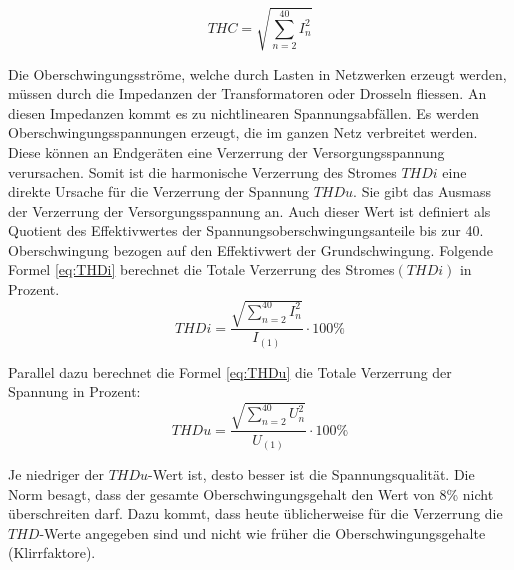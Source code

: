 \begin{equation}\label{eq:THC}
THC = {\sqrt{\sum_{n=2}^{40} I_n^2}}
\end{equation}



Die Oberschwingungsströme, welche durch Lasten in Netzwerken erzeugt werden, müssen durch die Impedanzen der Transformatoren oder Drosseln fliessen. An diesen Impedanzen kommt es zu nichtlinearen Spannungsabfällen. Es werden Oberschwingungsspannungen erzeugt, die im ganzen Netz verbreitet werden. Diese können an Endgeräten eine Verzerrung der Versorgungsspannung verursachen. Somit ist die harmonische Verzerrung des Stromes $THDi$ eine direkte Ursache für die Verzerrung der Spannung $THDu$. Sie gibt das Ausmass der Verzerrung der Versorgungsspannung an. Auch dieser Wert ist definiert als Quotient des Effektivwertes der Spannungsoberschwingungsanteile bis zur 40. Oberschwingung bezogen auf den Effektivwert der Grundschwingung. 
Folgende Formel \ref{eq:THDi} berechnet die Totale Verzerrung des Stromes$(THDi)$ in Prozent.
\begin{equation}\label{eq:THDi}
THDi = \frac{\sqrt{\sum_{n=2}^{40} I_n^2}}{I_{(1)}} \cdot 100 \%
\end{equation}

Parallel dazu berechnet die Formel \ref{eq:THDu} die Totale Verzerrung der Spannung in Prozent:
\begin{equation}\label{eq:THDu}
THDu = \frac{\sqrt{\sum_{n=2}^{40} U_n^2}}{U_{(1)}} \cdot 100\%
\end{equation}


Je niedriger der $THDu$-Wert ist, desto besser ist die Spannungsqualität. Die Norm besagt, dass der gesamte Oberschwingungsgehalt den Wert von 8\% nicht überschreiten darf. Dazu kommt, dass heute üblicherweise für die Verzerrung die $THD$-Werte angegeben sind und nicht wie früher die Oberschwingungsgehalte (Klirrfaktore).\\







\newpage
